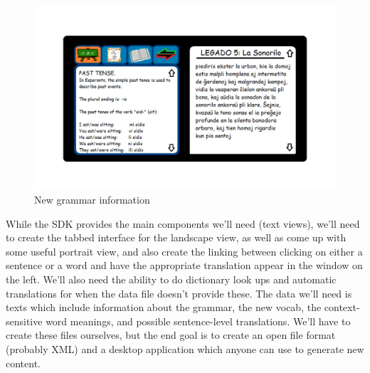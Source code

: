 \documentclass[11pt]{article}
\begin{document}
\begin{figure}[h]
  \caption{New grammar information}
  \label{grammar}
  \includegraphics[scale=.5]{grammar_tab.png}
\end{figure}

While the SDK provides the main components we'll need (text views), we'll need to create the tabbed interface for the landscape view, as well as come up with some useful portrait view, and also create the linking between clicking on either a sentence or a word and have the appropriate translation appear in the window on the left.  We'll also need the ability to do dictionary look ups and automatic translations for when the data file doesn't provide these. The data we'll need is texts which include information about the grammar, the new vocab, the context-sensitive word meanings, and possible sentence-level translations. We'll have to create these files ourselves, but the end goal is to create an open file format (probably XML) and a desktop application which anyone can use to generate new content.
\end{document}
